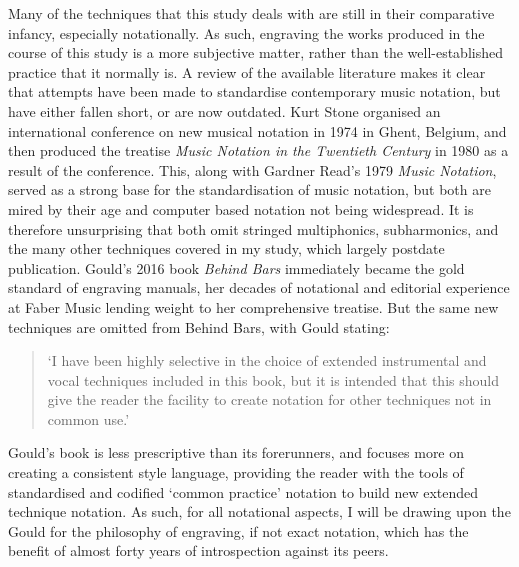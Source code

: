 Many of the techniques that this study deals with are still in their comparative infancy, especially notationally. As such, engraving the works produced in the course of this study is a more subjective matter, rather than the well-established practice that it normally is. A review of the available literature makes it clear that attempts have been made to standardise contemporary music notation, but have either fallen short, or are now outdated. Kurt Stone organised an international conference on new musical notation in 1974 in Ghent, Belgium, and then produced the treatise \emph{Music Notation in the Twentieth Century} in 1980 as a result of the conference.\autocite[xiii]{stoneMusicNotationTwentieth1980} This, along with Gardner Read’s 1979 \emph{Music Notation}, served as a strong base for the standardisation of music notation, but both are mired by their age and computer based notation not being widespread.\autocite{readCompendiumModernInstrumental1993} It is therefore unsurprising that both omit stringed multiphonics, subharmonics, and the many other techniques covered in my study, which largely postdate publication. Gould’s 2016 book \emph{Behind Bars} immediately became the gold standard of engraving manuals, her decades of notational and editorial experience at Faber Music lending weight to her comprehensive treatise. But the same new techniques are omitted from Behind Bars, with Gould stating: 
\begin{quotation}
    ‘I have been highly selective in the choice of extended instrumental and vocal techniques included in this book, but it is intended that this should give the reader the facility to create notation for other techniques not in common use.’\autocite[iii]{gouldBars2011} 
\end{quotation}
Gould’s book is less prescriptive than its forerunners, and focuses more on creating a consistent style language, providing the reader with the tools of standardised and codified ‘common practice’ notation to build new extended technique notation. As such, for all notational aspects, I will be drawing upon the Gould for the philosophy of engraving, if not exact notation, which has the benefit of almost forty years of introspection against its peers.

